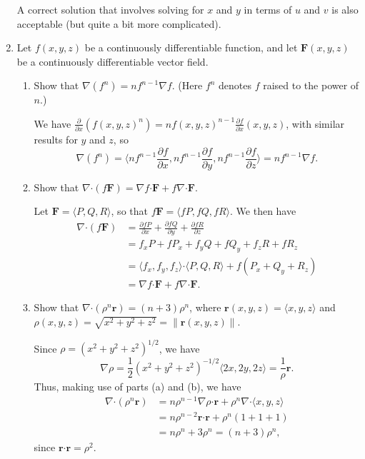 \documentclass[12pt]{article}
\newcommand{\points}[1]{\marginpar{\hspace{24pt}[#1]}}
\renewcommand{\r}{\mathbf{r}}
\newcommand{\dotp}{\boldsymbol{\cdot}}
\newcommand{\F}{\mathbf{F}}
\newcommand{\pd}[2]{\frac{\partial #1}{\partial #2}}
\begin{document}
\begin{enumerate}
A correct solution that involves solving for $x$ and $y$ in terms of $u$ and $v$ is also acceptable (but quite a bit more complicated).

\newpage

\item Let $f(x,y,z)$ be a continuously differentiable function, and let $\F(x,y,z)$ be a continuously differentiable vector field.
\begin{enumerate}
\item Show that $\nabla (f^n) = nf^{n-1}\nabla f$. (Here $f^n$ denotes $f$ raised to the power of $n$.)\points{5}

\bigskip

We have $\pd{}{x}(f(x,y,z)^n) = nf(x,y,z)^{n-1}\pd{f}{x}(x,y,z)$, with similar results for $y$ and $z$, so
\[
\nabla (f^n) = \langle nf^{n-1}\pd{f}{x},nf^{n-1}\pd{f}{y},nf^{n-1}\pd{f}{z}\rangle = nf^{n-1}\nabla f.
\]

\bigskip

\item Show that $\nabla\dotp (f\F) = \nabla f\dotp \F+f\nabla\dotp \F$. \points{5}

\bigskip

Let $\F = \langle P,Q,R\rangle$, so that $f\F = \langle fP, fQ, fR\rangle$. We then have
\begin{align*}
\nabla\dotp(f\F) & = \pd{fP}{x}+\pd{fQ}{y}+\pd{fR}{z}\\
& = f_xP+fP_x+f_yQ+fQ_y+f_zR+fR_z\\
& = \langle f_x,f_y,f_z\rangle\dotp \langle P,Q,R\rangle + f(P_x+Q_y+R_z)\\
& = \nabla f\dotp \F + f\nabla\dotp \F.
\end{align*}

\bigskip

\item Show that $\nabla\dotp (\rho^n\r)=(n+3)\rho^n$, where $\r(x,y,z) = \langle x,y,z\rangle$ and $\rho(x,y,z) = \sqrt{x^2+y^2+z^2} = \lVert\r(x,y,z)\rVert$. \points{4}

\bigskip

Since $\rho = (x^2+y^2+z^2)^{1/2}$, we have
\[
\nabla \rho = \frac{1}{2}(x^2+y^2+z^2)^{-1/2}\langle 2x, 2y, 2z\rangle = \frac{1}{\rho}\r.
\]
Thus, making use of parts (a) and (b), we have
\begin{align*}
\nabla\dotp (\rho^n\r) &= n\rho^{n-1}\nabla\rho\dotp \r + \rho^n\nabla \dotp \langle x,y,z\rangle\\
& = n\rho^{n-2}\r\dotp\r + \rho^n(1+1+1)\\
& = n\rho^n+3\rho^n = (n+3)\rho^n,
\end{align*}
since $\r\dotp\r = \rho^2$.
\end{enumerate}


\end{enumerate}
\end{document}
